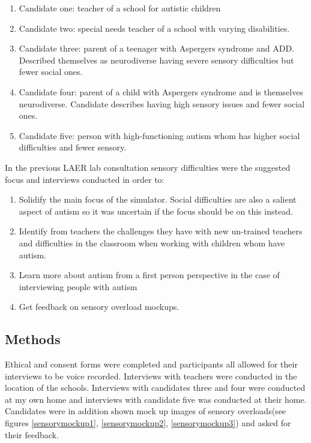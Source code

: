 \documentclass[11pt]{report}
\begin{document}
\begin{enumerate}
\item Candidate one: teacher of a school for autistic children
\item Candidate two: special needs teacher of a school with varying disabilities.
\item Candidate three: parent of a teenager with Aspergers syndrome and ADD. Described themselves as neurodiverse having severe sensory difficulties but fewer social ones.
\item Candidate four: parent of a child with Aspergers syndrome and is themselves neurodiverse. Candidate describes having high sensory issues and fewer social ones.
\item Candidate five: person with high-functioning autism whom has higher social difficulties and fewer sensory.
\end{enumerate}

In the previous LAER lab consultation sensory difficulties were the suggested focus and interviews conducted in order to:

\begin{enumerate}
\item Solidify the main focus of the simulator. Social difficulties are also a salient aspect of autism so it was uncertain if the focus should be on this instead.
\item Identify from teachers the challenges they have with new un-trained teachers and difficulties in the classroom when working with children whom have autism.
\item Learn more about autism from a first person perspective in the case of interviewing people with autism
\item Get feedback on sensory overload mockups.
\end{enumerate} 

\subsection{Methods}

Ethical and consent forms were completed and participants all allowed for their interviews to be voice recorded. Interviews with teachers were conducted in the location of the schools. Interviews with candidates three and four were conducted at my own home and interviews with candidate five was conducted at their home. Candidates were in addition shown mock up images of sensory overloads(see figures \ref{sensorymockup1}, \ref{sensorymockup2}, \ref{sensorymockup3}) and asked for their feedback. 
\end{document}
